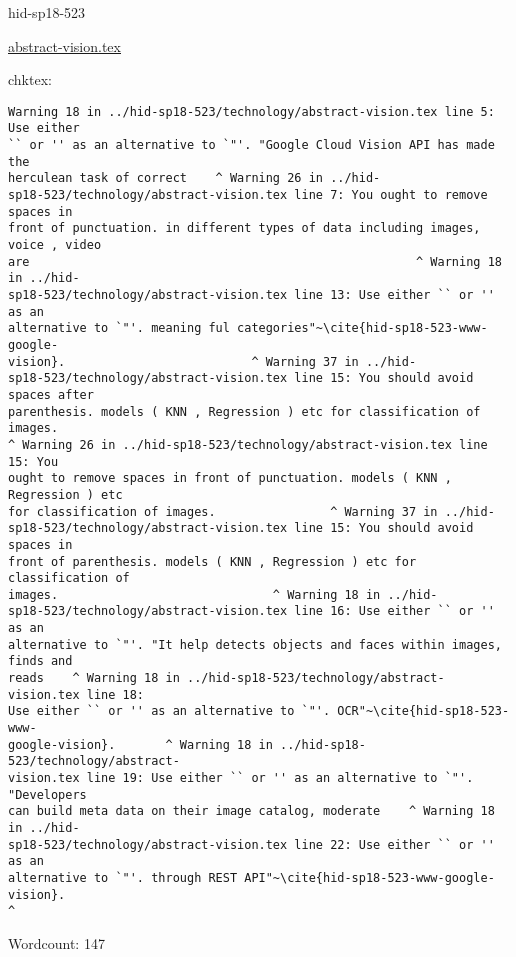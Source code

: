 

\begin{IU}

hid-sp18-523

\href{https://github.com/cloudmesh-community/hid-sp18-523/blob/master//technology/abstract-vision.tex}{abstract-vision.tex}

 
chktex:
\begin{tiny}
\begin{verbatim}
Warning 18 in ../hid-sp18-523/technology/abstract-vision.tex line 5: Use either
`` or '' as an alternative to `"'. "Google Cloud Vision API has made the
herculean task of correct    ^ Warning 26 in ../hid-
sp18-523/technology/abstract-vision.tex line 7: You ought to remove spaces in
front of punctuation. in different types of data including images, voice , video
are                                                      ^ Warning 18 in ../hid-
sp18-523/technology/abstract-vision.tex line 13: Use either `` or '' as an
alternative to `"'. meaning ful categories"~\cite{hid-sp18-523-www-google-
vision}.                          ^ Warning 37 in ../hid-
sp18-523/technology/abstract-vision.tex line 15: You should avoid spaces after
parenthesis. models ( KNN , Regression ) etc for classification of images.
^ Warning 26 in ../hid-sp18-523/technology/abstract-vision.tex line 15: You
ought to remove spaces in front of punctuation. models ( KNN , Regression ) etc
for classification of images.                ^ Warning 37 in ../hid-
sp18-523/technology/abstract-vision.tex line 15: You should avoid spaces in
front of parenthesis. models ( KNN , Regression ) etc for classification of
images.                              ^ Warning 18 in ../hid-
sp18-523/technology/abstract-vision.tex line 16: Use either `` or '' as an
alternative to `"'. "It help detects objects and faces within images, finds and
reads    ^ Warning 18 in ../hid-sp18-523/technology/abstract-vision.tex line 18:
Use either `` or '' as an alternative to `"'. OCR"~\cite{hid-sp18-523-www-
google-vision}.       ^ Warning 18 in ../hid-sp18-523/technology/abstract-
vision.tex line 19: Use either `` or '' as an alternative to `"'. "Developers
can build meta data on their image catalog, moderate    ^ Warning 18 in ../hid-
sp18-523/technology/abstract-vision.tex line 22: Use either `` or '' as an
alternative to `"'. through REST API"~\cite{hid-sp18-523-www-google-vision}.
^
\end{verbatim}
\end{tiny}

Wordcount: 147

\end{IU}

